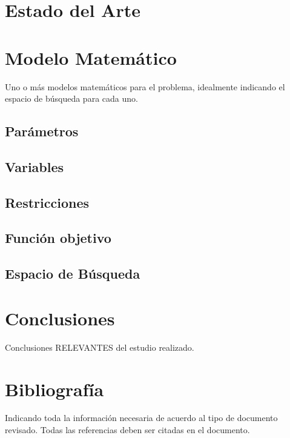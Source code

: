 \documentclass[letter, 10pt]{article}
\begin{document}
\section{Estado del Arte}

\section{Modelo Matem\'atico}
Uno o m\'as modelos matem\'aticos para el problema, idealmente indicando el espacio de b\'usqueda para cada uno.
\subsection{Par\'ametros}
\subsection{Variables}
\subsection{Restricciones}
\subsection{Funci\'on objetivo}
\subsection{Espacio de B\'usqueda}

\section{Conclusiones}
Conclusiones RELEVANTES del estudio realizado.

\section{Bibliograf\'ia}
Indicando toda la informaci\'on necesaria de acuerdo al tipo de documento revisado. Todas las referencias deben ser 
citadas en el documento.


\end{document}
